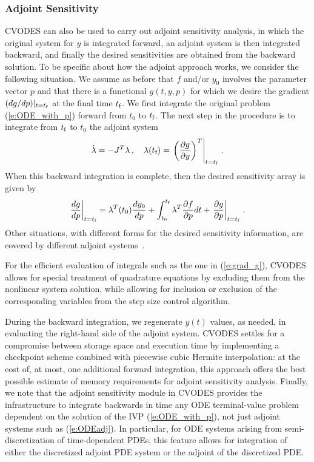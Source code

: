 \subsubsection{Adjoint Sensitivity}
CVODES can also be used to carry out adjoint sensitivity analysis, 
in which the original system for $y$ is integrated forward, 
an adjoint system is then integrated backward, and finally the desired 
sensitivities are obtained from the backward solution. 
To be specific about how the adjoint approach works, we consider
the following situation. We assume as before that $f$ and/or $y_0$
involves the parameter vector $p$ and that there is a
functional $g(t,y,p)$ for which we desire the 
gradient $(dg/dp)|_{t=t_{\mbox{\tiny f}}}$ 
at the final time $t_{\mbox{\scriptsize f}}$.
We first integrate the original problem (\ref{e:ODE_with_p}) forward 
from $t_0$ to $t_{\mbox{\scriptsize f}}$. The next step in the procedure is to integrate 
from $t_{\mbox{\scriptsize f}}$ to $t_0$ the adjoint system
\begin{equation}\label{e:ODEadj}
  \dot{\lambda} = -J^T \lambda \, , \quad
  \lambda(t_{\mbox{\scriptsize f}}) = \left. \left( \frac{\partial g}{\partial y}
    \right)^T \right| _{t=t_{\mbox{\tiny f}}} \, .
\end{equation}
When this backward integration is complete, then the desired
sensitivity array is given by
\begin{equation}\label{e:grad_g}
  \left. \frac{dg}{dp}\right|_{t=t_{\mbox{\tiny f}}} = 
  \lambda^T(t_0) \frac{dy_0}{dp}
  + \int_{t_0}^{t_{\mbox{\tiny f}}} \lambda^T \frac{\partial f}{\partial p} dt + 
  \left. \frac{\partial g}{\partial p} \right|_{t=t_{\mbox{\tiny f}}} \, . 
\end{equation}
Other situations, with different forms for the desired sensitivity
information, are covered by different adjoint systems~\cite{CLPS:03}.

For the efficient evaluation of integrals such as the one in (\ref{e:grad_g}),
CVODES allows for special treatment of quadrature equations by excluding them
from the nonlinear system solution, while allowing for inclusion or exclusion
of the corresponding variables from the step size control algorithm.

During the backward integration, we regenerate $y(t)$ values, as needed,
in evaluating the right-hand side of the adjoint system.
%
CVODES settles for a compromise between storage space and execution time 
by implementing a checkpoint scheme combined with piecewise cubic Hermite 
interpolation: at the cost of, at most, one additional forward integration, 
this approach offers the best possible estimate of memory requirements for 
adjoint sensitivity analysis.
%
Finally, we note that the adjoint sensitivity module in CVODES provides 
the infrastructure to integrate backwards in time any ODE terminal-value 
problem dependent on the solution of the IVP (\ref{e:ODE_with_p}), 
not just adjoint systems such as (\ref{e:ODEadj}). In particular, 
for ODE systems arising from semi-discretization of time-dependent PDEs, 
this feature allows for integration of either the discretized adjoint 
PDE system or the adjoint of the discretized PDE.

